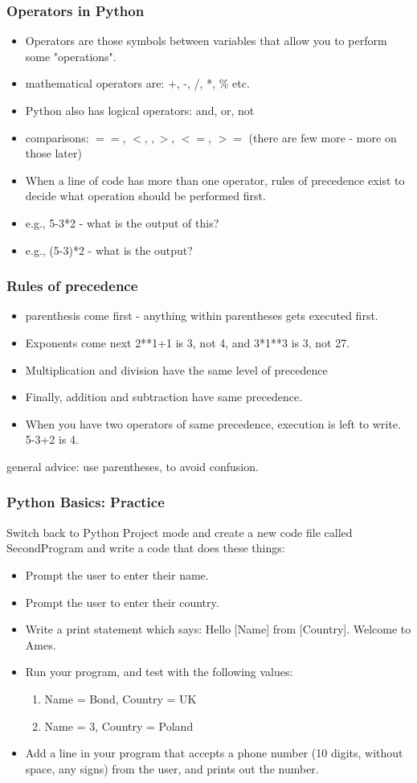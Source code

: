 \documentclass{beamer}
\begin{document}
\begin{frame}
\frametitle{Operators in Python}
\begin{itemize}
\item Operators are those symbols between variables that allow you to perform some "operations".
\item mathematical operators are: +, -, /, *, \% etc.
\item Python also has logical operators: and, or, not
\item comparisons: $==$, $<$, $,>$, $<=$, $>=$ (there are few more - more on those later)
\item When a line of code has more than one operator, rules of precedence exist to decide what operation should be performed first.
\item e.g., 5-3*2 - what is the output of this? \pause
\item e.g., (5-3)*2 - what is the output?
\end{itemize}
\end{frame}

\begin{frame}
\frametitle{Rules of precedence}
\begin{itemize}
\item parenthesis come first - anything within parentheses gets executed first. 
\item Exponents come next 2**1+1 is 3, not 4, and 3*1**3 is 3, not 27.
\item Multiplication and division have the same level of precedence
\item Finally, addition and subtraction have same precedence.
\item When you have two operators of same precedence, execution is left to write. 5-3+2 is 4. 
\end{itemize}
general advice: use parentheses, to avoid confusion.
\end{frame}

\begin{frame}
\frametitle{Python Basics: Practice}
Switch back to Python Project mode and create a new code file called SecondProgram and write a code that does these things:
\begin{itemize}
\item Prompt the user to enter their name.
\item Prompt the user to enter their country.
\item Write a print statement which says:  Hello [Name] from [Country]. Welcome to Ames.
\item Run your program, and test with the following values:
\begin{enumerate}
\item Name = Bond, Country = UK
\item Name = 3, Country = Poland
\end{enumerate}
\item Add a line in your program that accepts a phone number (10 digits, without space, any signs) from the user, and prints out the number. 
\end{itemize}
\end{frame}
\end{document}
